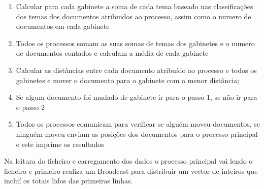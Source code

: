 \documentclass[times, 10pt,twocolumn]{article}
\begin{document}
\begin{enumerate}
\item Calcular para cada gabinete a soma de cada tema baseado nas classificações dos temas dos documentos atribuidos ao processo, assim como o numero de documentos em cada gabinete
\item Todos os processos somam as suas somas de temas dos gabinetes e o numero de documentos contados e calculam a média de cada gabinete
\item Calcular as distâncias entre cada documento atribuído ao processo e todos os gabinetes e mover o documento para o gabinete com a menor distância;
\item Se algum documento foi mudado de gabinete ir para o passo 1, se não ir para o passo 2
\item Todos os processos comunicam para verificar se alguém moveu documentos, se ninguém moveu enviam as posições dos documentos para o processo principal e este imprime os resultados
\end{enumerate}







Na leitura do ficheiro e carregamento dos dados o processo principal vai lendo o ficheiro e primeiro realiza um Broadcast para distribuir um vector de inteiros que incluí os totais lidos das primeiras linhas.
\end{document}
